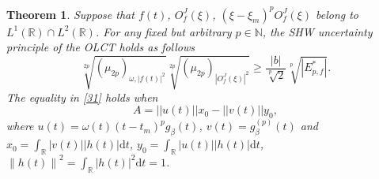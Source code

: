 \documentclass[preprint,12pt]{elsarticle}
\newtheorem{thm}{Theorem}
\begin{document}
\begin{thm}
	\label{thm3.4}
	Suppose that $f(t)$, $O_f^J(\xi)$, $(\xi-\xi_m)^p O_f^J(\xi)$ belong to $L^1(\mathbb{R}) \cap L^2(\mathbb{R})$. For any fixed but arbitrary $p \in \mathbb{N}$, the SHW uncertainty principle of the OLCT holds as follows
	\begin{equation}
	\label{31}
	\sqrt[2p]{(\mu_{2p})_{\omega, \left| f(t) \right|^2}} \sqrt[2p]{(\mu_{2p})_{ \left| O_f^J(\xi) \right|^2}} \ge \frac{|b|}{\sqrt[p]{2}} \sqrt[p]{\left| E_{p,f}^* \right|}.
	\end{equation}
	The equality in \eqref{31} holds when 
	\begin{equation}
	A = ||u(t)||x_0-||v(t)||y_0,
	\end{equation}
	where $u(t) = \omega(t) (t-t_m)^p g_{\beta}(t)$, $v(t) = g_{\beta}^{(p)} (t)$ and $x_0 = \int_{\mathbb{R}} \left|v(t) \right| \left| h(t) \right| \mathrm{d}t$, $y_0 = \int_{\mathbb{R}} \left|u(t) \right| \left| h(t) \right| \mathrm{d}t$, $\left\|h(t)\right\|^2 = \int_{\mathbb{R}} \left|h(t) \right|^2 \mathrm{d}t =1$.
\end{thm}
\end{document}
